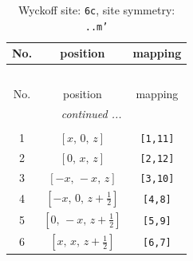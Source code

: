 \documentclass[fleqn,8pt]{jsarticle}
\begin{document}
\renewcommand{\arraystretch}{1.2}
\begin{longtable}{ccc}
\caption{Wyckoff site: {\tt 6c}, site symmetry: {\tt ..m'}}
 \\
 \hline \hline
No. & position & mapping \\ \hline \endfirsthead

\multicolumn{2}{l}{\tablename\ \thetable{}} \\
 \hline \hline
No. & position & mapping \\ \hline \endhead

 \hline \hline
\multicolumn{2}{r}{\footnotesize\it continued ...} \\ \endfoot

 \hline \hline
\multicolumn{2}{r}{} \\ \endlastfoot

1 & $\left[ x,\, 0,\, z \right]$ & {\tt [1,11]} \\ \hline
2 & $\left[ 0,\, x,\, z \right]$ & {\tt [2,12]} \\ \hline
3 & $\left[ - x,\, - x,\, z \right]$ & {\tt [3,10]} \\ \hline
4 & $\left[ - x,\, 0,\, z + \frac{1}{2} \right]$ & {\tt [4,8]} \\ \hline
5 & $\left[ 0,\, - x,\, z + \frac{1}{2} \right]$ & {\tt [5,9]} \\ \hline
6 & $\left[ x,\, x,\, z + \frac{1}{2} \right]$ & {\tt [6,7]} \\
\end{longtable}
\renewcommand{\arraystretch}{1.2}
\end{document}
